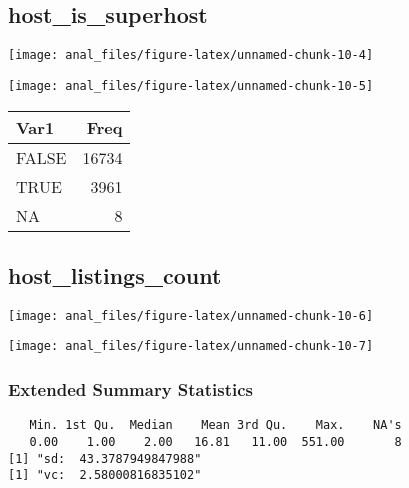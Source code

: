 \centering

\hypertarget{host_is_superhost}{%
\subsection{host\_is\_superhost}\label{host_is_superhost}}

\begin{center}\texttt{[image: anal\_files/figure-latex/unnamed-chunk-10-4]} \end{center}

\begin{center}\texttt{[image: anal\_files/figure-latex/unnamed-chunk-10-5]} \end{center}

\begin{table}[H]
\centering
\begin{tabular}[t]{lr}
\toprule
Var1 & Freq\\
\midrule
FALSE & 16734\\
TRUE & 3961\\
NA & 8\\
\bottomrule
\end{tabular}
\end{table}
\pagebreak

\centering

\hypertarget{host_listings_count}{%
\subsection{host\_listings\_count}\label{host_listings_count}}

\begin{center}\texttt{[image: anal\_files/figure-latex/unnamed-chunk-10-6]} \end{center}

\begin{center}\texttt{[image: anal\_files/figure-latex/unnamed-chunk-10-7]} \end{center}

\hypertarget{extended-summary-statistics}{%
\subsubsection{Extended Summary
Statistics}\label{extended-summary-statistics}}

\begin{verbatim}   Min. 1st Qu.  Median    Mean 3rd Qu.    Max.    NA's 
   0.00    1.00    2.00   16.81   11.00  551.00       8 
[1] "sd:  43.3787949847988"
[1] "vc:  2.58000816835102"
\end{verbatim}

